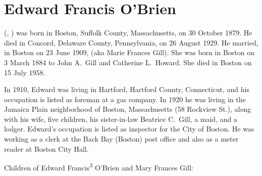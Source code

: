 \section{Edward Francis O'Brien}

 (, ) was born in Boston, Suffolk County, Massachusetts, on 30 October 1879.\cite{Edward3OBrien2Birth} He died in Concord, Delaware County, Pennsylvania, on 26 August 1929.\cite{Edward3OBrien2Death} He married, in Boston on 23 June 1909,  (aka Marie Frances Gill).\cite{Edward3OBrien2Marriage} She was born in Boston on 3 March 1884 to John A.\ Gill and Catherine L.\ Howard.\cite{MaryGillBirth,Edward3OBrien2Marriage} She died in Boston on 15 July 1958.\cite{MaryGillDeath,MaryGillDeath2}

In 1910, Edward was living in Hartford, Hartford County, Connecticut, and his occupation is listed as foreman at a gas company.\cite{Census1910Edward3OBrien} In 1920 he was living in the Jamaica Plain neighborhood of Boston, Massachusetts (58 Rockview St.), along with his wife, five children, his sister-in-law Beatrice C.\ Gill, a maid, and a lodger. Edward's occupation is listed as inspector for the City of Boston.\cite{Census1920Edward3OBrien} He was working as a clerk at the Back Bay (Boston) post office and also as a meter reader at Boston City Hall.\cite{Edward3OBrien1920}

\begin{KidsIntro}
	Children of Edward Francis\textsuperscript{3} O'Brien and Mary Frances Gill:
\end{KidsIntro}

